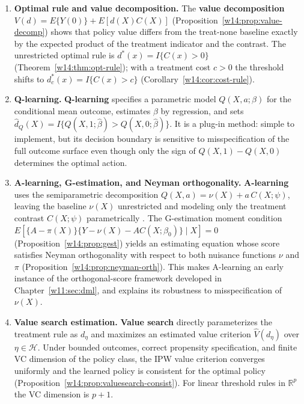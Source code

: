 \documentclass[master.tex]{subfiles}
\begin{document}
\begin{enumerate}

  \item \textbf{Optimal rule and value decomposition.}
    The \textbf{value decomposition} $V(d)=E\{Y(0)\}+E[d(X)C(X)]$
    (Proposition~\ref{w14:prop:value-decomp}) shows that policy value differs
    from the treat-none baseline exactly by the expected product of the
    treatment indicator and the contrast.  The unrestricted optimal rule is
    $d^\ast(x)=I\{C(x)>0\}$ (Theorem~\ref{w14:thm:opt-rule}); with a
    treatment cost $c>0$ the threshold shifts to $d_c^\ast(x)=I\{C(x)>c\}$
    (Corollary~\ref{w14:cor:cost-rule}).

  \item \textbf{Q-learning.}
    \textbf{Q-learning} specifies a parametric model $Q(X,a;\beta)$ for the
    conditional mean outcome, estimates $\beta$ by regression, and sets
    $\hat d_Q(X)=I\{Q(X,1;\hat\beta)>Q(X,0;\hat\beta)\}$.  It is a plug-in
    method: simple to implement, but its decision boundary is sensitive to
    misspecification of the full outcome surface even though only the sign of
    $Q(X,1)-Q(X,0)$ determines the optimal action.

  \item \textbf{A-learning, G-estimation, and Neyman orthogonality.}
    \textbf{A-learning} uses the semiparametric decomposition
    $Q(X,a)=\nu(X)+a\,C(X;\psi)$, leaving the baseline $\nu(X)$ unrestricted
    and modeling only the treatment contrast $C(X;\psi)$ parametrically
    \citep{murphy2003optimal,robins2004optimal}.  The G-estimation moment
    condition $E[\{A-\pi(X)\}\{Y-\nu(X)-AC(X;\beta_0)\}\mid X]=0$
    (Proposition~\ref{w14:prop:gest}) yields an estimating equation whose
    score satisfies Neyman orthogonality with respect to both nuisance
    functions $\nu$ and $\pi$ (Proposition~\ref{w14:prop:neyman-orth}).
    This makes A-learning an early instance of the orthogonal-score
    framework developed in Chapter~\ref{w11:sec:dml}, and explains its
    robustness to misspecification of $\nu(X)$.

  \item \textbf{Value search estimation.}
    \textbf{Value search} directly parameterizes the treatment rule as
    $d_\eta$ and maximizes an estimated value criterion $\widehat V(d_\eta)$
    over $\eta\in\mathcal H$.  Under bounded outcomes, correct propensity
    specification, and finite VC dimension of the policy class, the IPW value
    criterion converges uniformly and the learned policy is consistent for the
    optimal policy (Proposition~\ref{w14:prop:valuesearch-consist}).  For
    linear threshold rules in $\mathbb{R}^p$ the VC dimension is $p+1$.


\end{enumerate}
\end{document}
